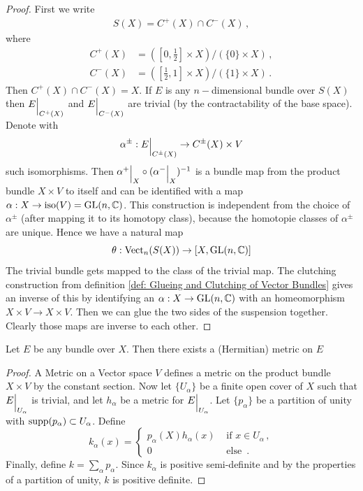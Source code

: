 \begin{proof}
	First we write 
	\begin{align*}
		S(X)=C^+(X)\cap C^-(X)\, ,
	\end{align*}where
	\begin{align*}
		C^+(X)&=([0,\frac{1}{2}]\times X)\slash (\{0\}\times X) \, ,\\
		C^-(X)&=([\frac{1}{2},1]\times X)\slash (\{1\}\times X)\, .
	\end{align*} Then $C^+(X)\cap C^-(X)=X$. If $E$ is any $n-$dimensional bundle over $S(X)$ then ${E}\einsch{C^+(X)}$ and ${E}\einsch{C^-(X)}$ are trivial (by the contractability of the base space). Denote with 
	\begin{equation*}
		\alpha^{\pm}:{E}\einsch{C^{\pm}(X)}\to C^{\pm}(X)\times V
	\end{equation*} such isomorphisms. Then ${\alpha^+}\einsch{X}\circ ({\alpha^-}\einsch{X})^{-1}$ is a bundle map from the product bundle $X\times V$ to itself and can be identified with a map $\alpha : X\to \mathrm{iso}(V)=\mathrm{GL}(n,\mathbb{C})$.
	This construction is independent from the choice of $\alpha^{\pm}$ (after mapping it to its homotopy class), because the homotopie classes of $\alpha^{\pm}$ are unique.
	Hence we have a natural map 
	\begin{equation*}
		\theta: \operatorname{\mathrm{Vect}}_n(S(X))\to [X,\mathrm{GL}(n,\mathbb{C})]
	\end{equation*} The trivial bundle gets mapped to the class of the trivial map. 
	The clutching construction from definition \ref{def: Glueing and Clutching of Vector Bundles} gives an inverse of this by identifying an $\alpha:X \to \mathrm{GL}(n,\mathbb{C})$ with an homeomorphism $X\times V \to X\times V$. Then we can glue the two sides of the suspension together. Clearly those maps are inverse to each other.
\end{proof}
\begin{lemma}
	Let $E$ be any bundle over $X$. Then there exists a (Hermitian) metric on $E$
\end{lemma}
\begin{proof}
	A Metric on a Vector space $V$ defines a metric on the product bundle $X\times V$ by the constant section. Now let $\{U_{\alpha}\}$ be a finite open cover of $X$ such that ${E}\einsch{U_{\alpha}}$ is trivial, and let $h_{\alpha}$ be a metric for ${E}\einsch{U_{\alpha}}$. Let $\{p_{\alpha}\}$ be a partition of unity with $\operatorname{\mathrm{supp}}(p_{\alpha})\subset U_{\alpha}$. Define 
	\begin{equation*}
		k_{\alpha}(x)=\begin{cases}
			p_{\alpha}(X)h_{\alpha}(x) & \text{ if } x\in U_{\alpha}\, ,\\
			0                          & \text{ else } \, .
		\end{cases}
	\end{equation*}
	Finally, define $k=\sum_{\alpha}p_{\alpha}$. Since $k_{\alpha}$ is positive semi-definite and by the properties of a partition of unity, $k$ is positive definite.
\end{proof}

